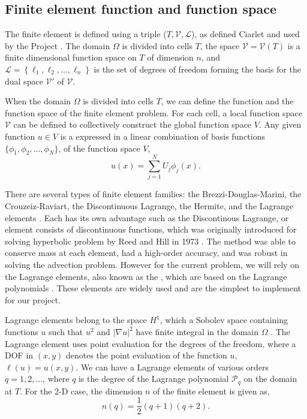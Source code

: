 \subsection*{Finite element function and function space}

The finite element is defined using a triple ($T, \mathcal{V}, \mathcal{L}$), as defined Ciarlet \cite{Ciarlet1972b} and used by the \fenics Project \cite{Logg2012b}. The domain $\Omega$ is divided into cells $T$, the space $\mathcal{V} = \mathcal{V}(T)$ is a finite dimensional function space on $T$ of dimension $n$, and $\mathcal{L} = \left\{ \ell_1,\ell_2,...,\ell_n \right\}$ is the set of degrees of freedom forming the basis for the dual space $\mathcal{V}'$ of $\mathcal{V}$.

When the domain $\Omega$ is divided into cells $T$, we can define the function and the function space of the finite element problem. For each cell, a local function space $\mathcal{V}$ can be defined to collectively construct the global function space $V$. Any given function $u \in V$ is a expressed in a linear combination of basis functions $\{\phi_1,\phi_2,...,\phi_N\}$,  of the function space $V$, 
	\begin{equation}
	u(x) = \sum_{j=1}^N U_j\phi_j(x).
	\end{equation}

There are several types of finite element families: the Brezzi-Douglas-Marini, the Crouzeiz-Raviart, the Discontinuous Lagrange, the Hermite, and the Lagrange elements \cite{Logg2012b}. Each has its own advantage such as the Discontinous Lagrange, or  element consists of discontinuous functions, which was originally introduced for solving hyperbolic problem by Reed and Hill in 1973 \cite{Reed1973a}. The method was able to conserve mass at each element, had a high-order accuracy, and was robust in solving the advection problem. However for the current problem, we will rely on the Lagrange elements, also known as the , which are based on the Lagrange polynomials \cite{Chen2011}. These elements are widely used and are the simplest to implement for our project. 

Lagrange elements belong to the space $H^1$, which a Sobolev space containing functions $u$ such that $u^2$ and $\left|\nabla u\right|^2$ have finite integral in the domain $\Omega$ \cite{Logg2012b}. The Lagrange element uses point evaluation for the degrees of the freedom, where a DOF in $(x,y)$ denotes the point evaluation of the function $u$, $\ell(u) = u(x,y)$. We can have a Lagrange elements of various orders $q = 1, 2,...$, where $q$ is the degree of the Lagrange polynomial $\mathcal{P}_q$ on the domain at $T$. For the 2-D case, the dimension $n$ of the finite element is given as,
	\begin{equation}
	n(q) = \frac{1}{2}(q + 1)(q + 2).
	\end{equation}

